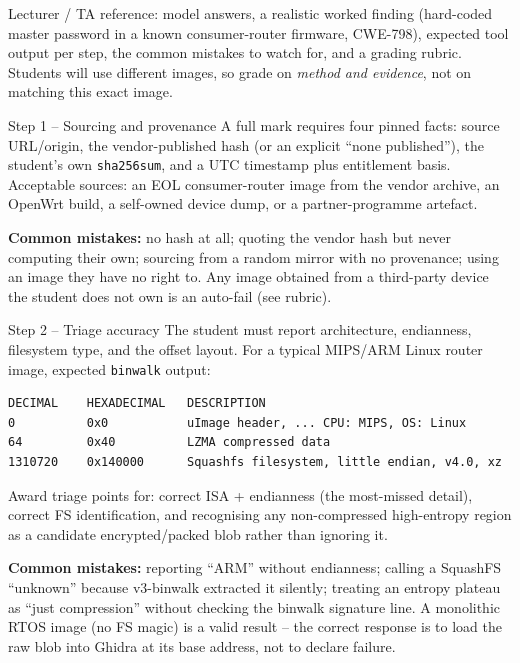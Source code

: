 \documentclass[11pt,a4paper]{article}
\begin{document}
\labheader

\begin{goalbox}
Lecturer / TA reference: model answers, a realistic worked finding
(hard-coded master password in a known consumer-router firmware,
CWE-798), expected tool output per step, the common mistakes to watch
for, and a grading rubric. Students will use different images, so grade
on \emph{method and evidence}, not on matching this exact image.
\end{goalbox}

\begin{solutionbox}{Step 1 -- Sourcing and provenance}
A full mark requires four pinned facts: source URL/origin, the
vendor-published hash (or an explicit ``none published''), the
student's own \texttt{sha256sum}, and a UTC timestamp plus entitlement
basis. Acceptable sources: an EOL consumer-router image from the
vendor archive, an OpenWrt build, a self-owned device dump, or a
partner-programme artefact.

\textbf{Common mistakes:} no hash at all; quoting the vendor hash but
never computing their own; sourcing from a random mirror with no
provenance; using an image they have no right to. Any image obtained
from a third-party device the student does not own is an auto-fail
(see rubric).
\end{solutionbox}

\begin{solutionbox}{Step 2 -- Triage accuracy}
The student must report architecture, endianness, filesystem type, and
the offset layout. For a typical MIPS/ARM Linux router image, expected
\texttt{binwalk} output:

\begin{lstlisting}
DECIMAL    HEXADECIMAL   DESCRIPTION
0          0x0           uImage header, ... CPU: MIPS, OS: Linux
64         0x40          LZMA compressed data
1310720    0x140000      Squashfs filesystem, little endian, v4.0, xz
\end{lstlisting}

Award triage points for: correct ISA + endianness (the most-missed
detail), correct FS identification, and recognising any non-compressed
high-entropy region as a candidate encrypted/packed blob rather than
ignoring it.

\textbf{Common mistakes:} reporting ``ARM'' without endianness;
calling a SquashFS ``unknown'' because v3-binwalk extracted it
silently; treating an entropy plateau as ``just compression'' without
checking the binwalk signature line. A monolithic RTOS image (no FS
magic) is a valid result -- the correct response is to load the raw
blob into Ghidra at its base address, not to declare failure.
\end{solutionbox}
\end{document}
